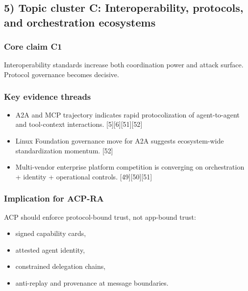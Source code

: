 \documentclass[11pt]{article}
\begin{document}
\hypertarget{topic-cluster-c-interoperability-protocols-and-orchestration-ecosystems}{%
\subsection{5) Topic cluster C: Interoperability, protocols, and
orchestration
ecosystems}\label{topic-cluster-c-interoperability-protocols-and-orchestration-ecosystems}}

\hypertarget{core-claim-c1}{%
\subsubsection{Core claim C1}\label{core-claim-c1}}

Interoperability standards increase both coordination power and attack
surface. Protocol governance becomes decisive.

\hypertarget{key-evidence-threads-2}{%
\subsubsection{Key evidence threads}\label{key-evidence-threads-2}}

\begin{itemize}
\tightlist
\item
  A2A and MCP trajectory indicates rapid protocolization of
  agent-to-agent and tool-context interactions.
  {[}5{]}{[}6{]}{[}51{]}{[}52{]}
\item
  Linux Foundation governance move for A2A suggests ecosystem-wide
  standardization momentum. {[}52{]}
\item
  Multi-vendor enterprise platform competition is converging on
  orchestration + identity + operational controls.
  {[}49{]}{[}50{]}{[}51{]}
\end{itemize}

\hypertarget{implication-for-acp-ra-2}{%
\subsubsection{Implication for ACP-RA}\label{implication-for-acp-ra-2}}

ACP should enforce protocol-bound trust, not app-bound trust:

\begin{itemize}
\tightlist
\item
  signed capability cards,
\item
  attested agent identity,
\item
  constrained delegation chains,
\item
  anti-replay and provenance at message boundaries.
\end{itemize}
\end{document}
